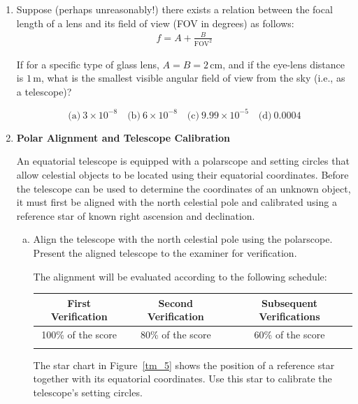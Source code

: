 \documentclass[a4paper,12pt]{extarticle}
\begin{document}
\begin{enumerate}[T1.]
\item Suppose (perhaps unreasonably!) there exists a relation between the focal length of a lens and its field of view (FOV in degrees) as follows:
\begin{align*}
	f = A + \frac{B}{\text{FOV}^2}
\end{align*}

If for a specific type of glass lens, \( A = B = 2 \, \text{cm} \), and if the eye-lens distance is \( 1 \, \text{m} \), what is the smallest visible angular field of view from the sky (i.e., as a telescope)?

\[
\text{(a)} \ 3 \times 10^{-8} \quad 
\text{(b)} \ 6 \times 10^{-8} \quad 
\text{(c)} \ 9.99 \times 10^{-5} \quad 
\text{(d)} \ 0.0004
\]

\clearpage

\item \textbf{Polar Alignment and Telescope Calibration}

An equatorial telescope is equipped with a polarscope and setting circles that allow celestial objects to be located using their equatorial coordinates. Before the telescope can be used to determine the coordinates of an unknown object, it must first be aligned with the north celestial pole and calibrated using a reference star of known right ascension and declination.

\begin{enumerate}[(a)]
	
	\item Align the telescope with the north celestial pole using the polarscope. Present the aligned telescope to the examiner for verification.
	
	The alignment will be evaluated according to the following schedule:
	
	\begin{center}
		\renewcommand{\arraystretch}{1.6}
		\begin{tabular}{|c|c|c|}
			\hline
			\textbf{First Verification} &
			\textbf{Second Verification} &
			\textbf{Subsequent Verifications} \\
			\hline
			100\% of the score &
			80\% of the score &
			60\% of the score \\
			\hline
			\rule{0pt}{2cm} & \rule{0pt}{2cm} & \rule{0pt}{2cm} \\
			\hline
		\end{tabular}
	\end{center}
	
	The star chart in Figure~\ref{tm_5} shows the position of a reference star together with its equatorial coordinates. Use this star to calibrate the telescope's setting circles.
	

\end{enumerate}
\end{enumerate}
\end{document}
